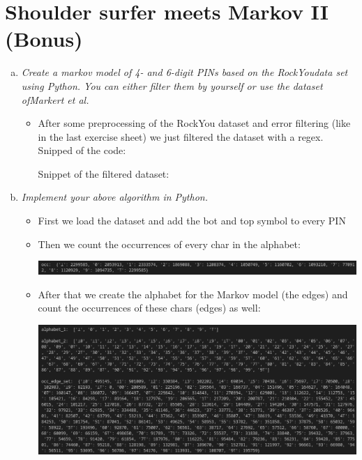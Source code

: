 \section{Shoulder surfer meets Markov II (Bonus)}
\begin{enumerate}[(a)]
    \item {\itshape Create a markov model of 4- and 6-digit PINs based on the RockYoudata set using Python. You can either filter them by yourself or use the dataset ofMarkert et al.}
    \begin{itemize}
        \item After some preprocessing of the RockYou dataset and error filtering (like in the last exercise sheet) we just filtered the dataset with a regex. Snipped of the code:
       
        Snippet of the filtered dataset:
       

    \end{itemize}
    
    \item {\itshape Implement your above algorithm in Python.}
    \begin{itemize}
        \item First we load the dataset and add the bot and top symbol to every PIN
        
\newpage        
        \item Then we count the occurrences of every char in the alphabet:
        
        \includegraphics[width=\linewidth]{src/u5/output_occ.png}
        
        \item After that we create the alphabet for the Markov model (the edges) and count the occurrences of these chars (edges) as well:
        
        \includegraphics[width=\linewidth]{src/u5/output_occ_2.png}
        

\end{itemize}
\end{enumerate}
